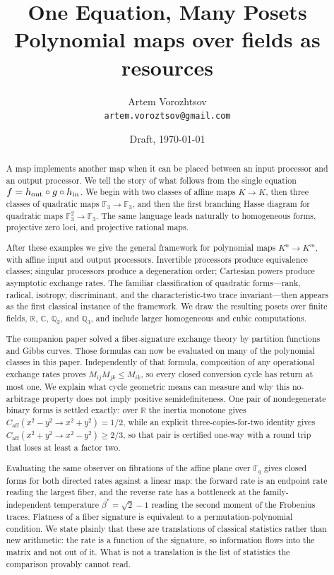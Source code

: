 \documentclass[11pt]{article}
\title{One Equation, Many Posets\\
\large Polynomial maps over fields as resources}
\author{Artem Vorozhtsov\\
\small\texttt{artem.voroztsov@gmail.com}}
\date{Draft, \today}
\theoremstyle{definition}
\theoremstyle{plain}
\theoremstyle{remark}
\newcommand{\F}{\mathbb F}
\newcommand{\Q}{\mathbb Q}
\newcommand{\R}{\mathbb R}
\newcommand{\C}{\mathbb C}
\newcommand{\caff}{C_{\mathrm{aff}}}
\begin{document}
\maketitle

\begin{abstract}
A map implements another map when it can be placed between an input processor
and an output processor.  We tell the story of what follows from the single
equation \(f=h_{\rm out}\circ g\circ h_{\rm in}\).  We begin with two classes
of affine maps \(K\to K\), then three classes of quadratic maps
\(\F_3\to\F_3\), and then the first branching Hasse diagram for quadratic maps
\(\F_3^2\to\F_3\).  The same language leads naturally to homogeneous forms,
projective zero loci, and projective rational maps.

After these examples we give the general framework for polynomial maps
\(K^n\to K^m\), with affine input and output processors.  Invertible processors
produce equivalence classes; singular processors produce a degeneration
order; Cartesian powers produce asymptotic exchange rates.  The familiar
classification of quadratic forms---rank, radical, isotropy, discriminant,
and the characteristic-two trace invariant---then appears as the first
classical instance of the framework.  We draw the resulting posets over
finite fields, \(\R\), \(\C\), \(\Q_2\), and \(\Q_3\), and include larger
homogeneous and cubic computations.

The companion paper solved a fiber-signature exchange theory by partition
functions and Gibbs curves.  Those formulas can now be evaluated on many of
the polynomial classes in this paper.  Independently of that formula,
composition of any operational exchange rates proves
\(M_{ij}M_{jk}\le M_{ik}\), so every closed conversion cycle has return at
most one.  We explain what cycle geometric means can measure and why this
no-arbitrage property does not imply positive semidefiniteness.  One pair of
nondegenerate binary forms is settled exactly: over \(\R\) the inertia
monotone gives \(\caff(x^2-y^2\to x^2+y^2)=1/2\), while an explicit
three-copies-for-two identity gives \(\caff(x^2+y^2\to x^2-y^2)\ge2/3\), so
that pair is certified one-way with a round trip that loses at least a factor
two.

Evaluating the same observer on fibrations of the affine plane over \(\F_q\)
gives closed forms for both directed rates against a linear map: the forward
rate is an endpoint rate reading the largest fiber, and the reverse rate has a
bottleneck at the family-independent temperature \(\beta^*=\sqrt2-1\) reading
the second moment of the Frobenius traces.  Flatness of a fiber signature is
equivalent to a permutation-polynomial condition.  We state plainly that these
are translations of classical statistics rather than new arithmetic: the rate
is a function of the signature, so information flows into the matrix and not
out of it.  What is not a translation is the list of statistics the comparison
provably cannot read.


\end{abstract}
\end{document}
